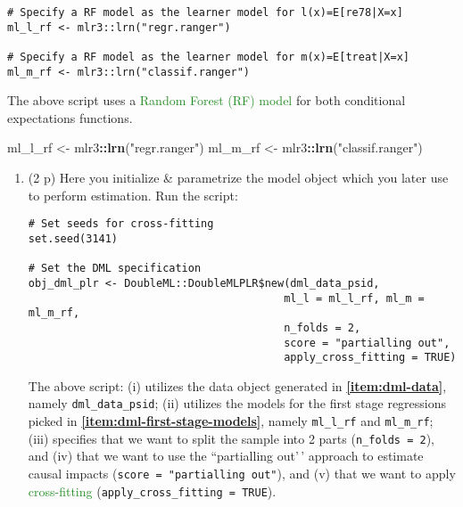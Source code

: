 \documentclass[
]{article}
\newenvironment{Shaded}{\begin{snugshade}}{\end{snugshade}}
\newcommand{\FunctionTok}[1]{\textcolor[rgb]{0.13,0.29,0.53}{\textbf{#1}}}
\newcommand{\NormalTok}[1]{#1}
\newcommand{\OtherTok}[1]{\textcolor[rgb]{0.56,0.35,0.01}{#1}}
\newcommand{\SpecialCharTok}[1]{\textcolor[rgb]{0.81,0.36,0.00}{\textbf{#1}}}
\newcommand{\StringTok}[1]{\textcolor[rgb]{0.31,0.60,0.02}{#1}}
\begin{document}
\begin{enumerate}
\begin{enumerate}
\begin{verbatim}
# Specify a RF model as the learner model for l(x)=E[re78|X=x]
ml_l_rf <- mlr3::lrn("regr.ranger")

# Specify a RF model as the learner model for m(x)=E[treat|X=x]
ml_m_rf <- mlr3::lrn("classif.ranger")
\end{verbatim}
  \end{enumerate}

  The above script uses a
  \textcolor{ForestGreen}{Random Forest (RF) model} for both conditional
  expectations functions.

\begin{Shaded}
\begin{Highlighting}[]
\NormalTok{ml\_l\_rf }\OtherTok{\textless{}{-}}\NormalTok{ mlr3}\SpecialCharTok{::}\FunctionTok{lrn}\NormalTok{(}\StringTok{"regr.ranger"}\NormalTok{)}
\NormalTok{ml\_m\_rf }\OtherTok{\textless{}{-}}\NormalTok{ mlr3}\SpecialCharTok{::}\FunctionTok{lrn}\NormalTok{(}\StringTok{"classif.ranger"}\NormalTok{)}
\end{Highlighting}
\end{Shaded}

  \begin{enumerate}
  \def\labelenumii{\alph{enumii}.}
  \setcounter{enumii}{6}
  \item
    (2 p) Here you initialize \& parametrize the model object which you
    later use to perform estimation. Run the script:

\begin{verbatim}
# Set seeds for cross-fitting
set.seed(3141)

# Set the DML specification
obj_dml_plr <- DoubleML::DoubleMLPLR$new(dml_data_psid, 
                                        ml_l = ml_l_rf, ml_m = ml_m_rf, 
                                        n_folds = 2,
                                        score = "partialling out",
                                        apply_cross_fitting = TRUE)
\end{verbatim}

    The above script: (i) utilizes the data object generated in
    \textbf{\ref{item:dml-data}}, namely \texttt{dml\_data\_psid}; (ii)
    utilizes the models for the first stage regressions picked in
    \textbf{\ref{item:dml-first-stage-models}}, namely
    \texttt{ml\_l\_rf} and \texttt{ml\_m\_rf}; (iii) specifies that we
    want to split the sample into 2 parts (\texttt{n\_folds = 2}), and
    (iv) that we want to use the ``partialling out'\,' approach to
    estimate causal impacts (\texttt{score = "partialling out"}), and
    (v) that we want to apply \textcolor{ForestGreen}{cross-fitting}
    (\texttt{apply\_cross\_fitting = TRUE}).\label{item:dml-model}
  \end{enumerate}


\end{enumerate}
\end{document}
